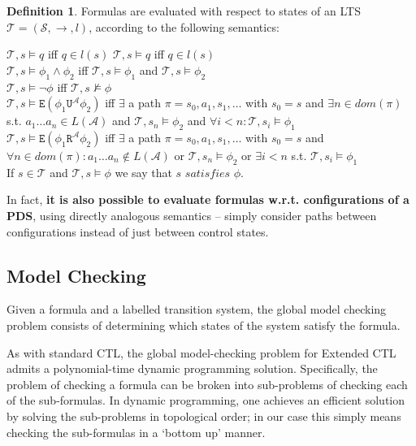 \documentclass[11pt]{article}
\theoremstyle{definition}
\newtheorem{mydef}{Definition}
\begin{document}
\begin{mydef}
Formulas are evaluated with respect to states of an LTS $\mathcal{T} = (\mathcal{S},
\rightarrow, l)$, according to the following semantics:

$\mathcal{T}, s \models q$ iff $q \in l(s)$
$\mathcal{T}, s \models q$ iff $q \in l(s)$ \\
$\mathcal{T}, s \models \phi_1 \wedge \phi_2$ iff $\mathcal{T}, s \models \phi_1$
and $\mathcal{T}, s \models \phi_2$ \\
$\mathcal{T}, s \models \neg \phi $ iff $\mathcal{T}, s \not\models \phi$ \\
$\mathcal{T}, s \models \texttt{E}(\phi_1 \texttt{U}^\mathcal{A} \phi_2) $ iff 
$\exists$ a path $\pi = s_0, a_1, s_1, \dots$ with $s_0 = s$ and $\exists n \in dom(\pi)$ s.t. $a_1 \dots a_n \in L(\mathcal{A})$ and $\mathcal{T}, s_n \models \phi_2$ and $\forall i < n : \mathcal{T}, s_i \models \phi_1$ \\
$\mathcal{T}, s \models \texttt{E}(\phi_1 \texttt{R}^\mathcal{A} \phi_2) $ iff 
$\exists$ a path $\pi = s_0, a_1, s_1, \dots$ with $s_0 = s$ and $\forall n \in dom(\pi): a_1 \dots a_n \not\in L(\mathcal{A})$ or $\mathcal{T}, s_n \models \phi_2$ or $\exists i < n$ s.t. $\mathcal{T}, s_i \models \phi_1$\\ 

If $s \in \mathcal{T}$ and $\mathcal{T}, s \models \phi$ we say that $s \textit{ satisfies } \phi$.
\end{mydef}

In fact, \textbf{it is also possible to evaluate formulas w.r.t. configurations of a
PDS}, using directly analogous semantics -- simply consider paths between
configurations instead of just between control states. 

\subsection{Model Checking}

Given a formula and a labelled transition system, the global model checking
problem consists of determining which states of the system satisfy the formula.

As with standard CTL, the global model-checking problem for Extended CTL admits
a polynomial-time dynamic programming solution.  Specifically, the problem of
checking a formula can be broken into sub-problems of checking each of the
sub-formulas.  In dynamic programming, one achieves an efficient solution by
solving the sub-problems in topological order; in our case this simply means
checking the sub-formulas in a `bottom up' manner.
\end{document}
